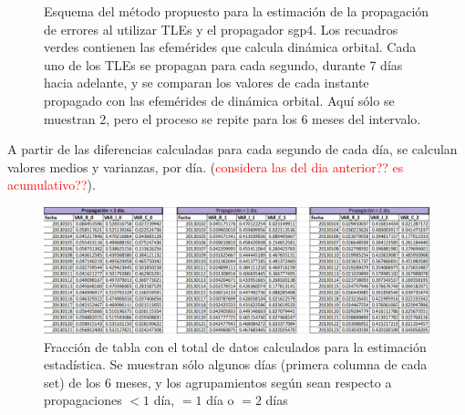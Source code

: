 \begin{figure}[!h]
\centering
{}
\caption[Descripci\'on del m\'etodo propuesto para la propagaci\'on de errores]{Esquema del m\'etodo propuesto para la estimaci\'on de la propagaci\'on de errores al utilizar TLEs y el propagador sgp4. Los recuadros verdes contienen las efem\'erides que calcula din\'amica orbital. Cada uno de los TLEs se propagan para cada segundo, durante 7 d\'ias hacia adelante, y se comparan los valores de cada instante propagado con las efem\'erides de din\'amica orbital. Aqu\'i s\'olo se muestran 2, pero el proceso se repite para los 6 meses del intervalo.}
\label{fig:metodotabla}
\end{figure}

A partir de las diferencias calculadas para cada segundo de cada d\'ia, se calculan valores medios y varianzas, por d\'ia. (\textcolor{red}{considera las del dia anterior?? es acumulativo??}).\\


\begin{figure}[!h]
\centering
\includegraphics[width=\textwidth]{imagenes/tablacompleta}
\caption{Fracci\'on de tabla con el total de datos calculados para la estimaci\'on estad\'istica. Se muestran s\'olo algunos d\'ias (primera columna de cada set) de los 6 meses, y los agrupamientos seg\'un sean respecto a propagaciones $< 1$ d\'ia, $= 1$ d\'ia o $= 2$ d\'ias}
\label{fig:tablacompleta}
\end{figure}

